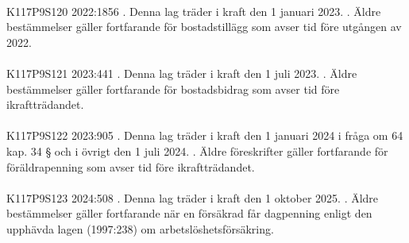 \documentclass[a4paper,notitlepage,openany,10pt]{book}
\begin{document}
\paragraph*{}
{\tiny K117P9S120}
2022:1856
. Denna lag träder i kraft den 1 januari 2023.
. Äldre bestämmelser gäller fortfarande för bostadstillägg som avser tid före utgången av 2022.
\paragraph*{}
{\tiny K117P9S121}
2023:441
. Denna lag träder i kraft den 1 juli 2023.
. Äldre bestämmelser gäller fortfarande för bostadsbidrag som avser tid före ikraftträdandet.
\paragraph*{}
{\tiny K117P9S122}
2023:905
. Denna lag träder i kraft den 1 januari 2024 i fråga om 64 kap. 34 § och i övrigt den 1 juli 2024.
. Äldre föreskrifter gäller fortfarande för föräldrapenning som avser tid före ikraftträdandet.
\paragraph*{}
{\tiny K117P9S123}
2024:508
. Denna lag träder i kraft den 1 oktober 2025.
. Äldre bestämmelser gäller fortfarande när en försäkrad får dagpenning enligt den upphävda lagen (1997:238) om arbetslöshetsförsäkring.
\printindex
\end{document}
